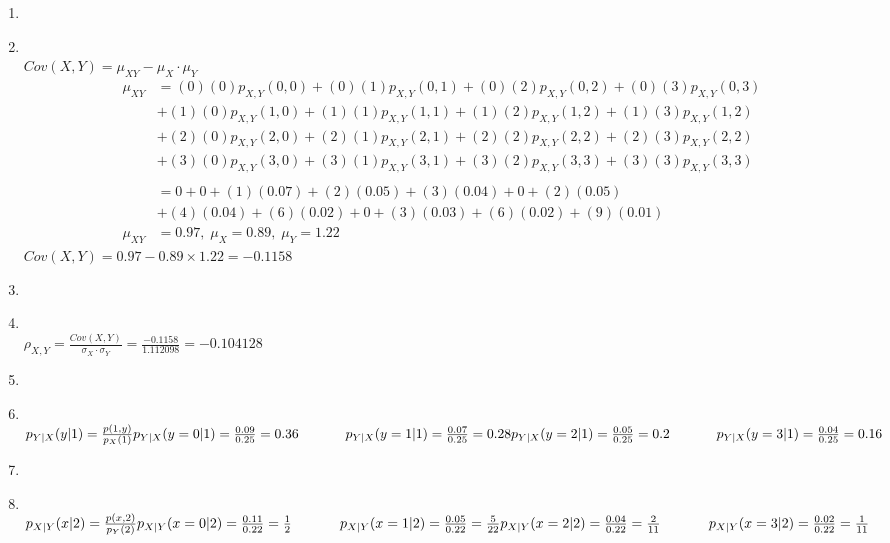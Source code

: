 \documentclass[11pt]{article}
\newcommand\Item[1][]{%
  \ifx\relax#1\relax  \item \else \item[#1] \fi
  \abovedisplayskip=0pt\abovedisplayshortskip=0pt~\vspace*{-\baselineskip}}
\begin{document}
\begin{enumerate}
\begin{enumerate}
                \Item \\
                $Cov(X,Y)=\mu_{XY} - \mu_{X}{\cdot}\mu_{Y}$ \\
                \begin{align*}
                        \mu_{XY}&=(0)(0)p_{X,Y}(0,0)+(0)(1)p_{X,Y}(0,1)+(0)(2)p_{X,Y}(0,2)+(0)(3)p_{X,Y}(0,3)\\
                        &+(1)(0)p_{X,Y}(1,0)+(1)(1)p_{X,Y}(1,1)+(1)(2)p_{X,Y}(1,2)+(1)(3)p_{X,Y}(1,2)\\
                        &+(2)(0)p_{X,Y}(2,0)+(2)(1)p_{X,Y}(2,1)+(2)(2)p_{X,Y}(2,2)+(2)(3)p_{X,Y}(2,2)\\
                        &+(3)(0)p_{X,Y} (3,0)+(3)(1)p_{X,Y}(3,1)+(3)(2)p_{X,Y}(3,3)+(3)(3)p_{X,Y}(3,3)\\\\
                        &=0+0+(1)(0.07)+(2)(0.05)+(3)(0.04)+0+(2)(0.05)\\
                        &+(4)(0.04)+(6)(0.02)+0+(3)(0.03)+(6)(0.02)+(9)(0.01)\\
                        \mu_{XY}&=0.97,\;\mu_{X}=0.89,\;\mu_{Y}=1.22
                \end{align*}
                $Cov(X,Y)=0.97-0.89{\times}1.22=-0.1158$

                \Item \\
                $\rho_{X,Y} = \frac{Cov(X,Y)}{\sigma_{X}{\cdot}\sigma_{Y}} = \frac{-0.1158}{1.112098}=-0.104128$\\

                \Item \\
                $p_{Y|X}(y|1)=\frac{p(1,y)}{p_{X}(1)}\\\\
                p_{Y|X}(y=0|1)=\frac{0.09}{0.25}=0.36  \hspace{0.1\linewidth}
                p_{Y|X}(y=1|1)=\frac{0.07}{0.25}=0.28  \\\\
                p_{Y|X}(y=2|1)=\frac{0.05}{0.25}=0.2   \hspace{0.1\linewidth}
                p_{Y|X}(y=3|1)=\frac{0.04}{0.25}=0.16$ \\

                \Item \\
                $p_{X|Y}(x|2)=\frac{p(x,2)}{p_{Y}(2)}\\\\
                p_{X|Y}(x=0|2)=\frac{0.11}{0.22}=\frac{1}{2}   \hspace{0.1\linewidth}
                p_{X|Y}(x=1|2)=\frac{0.05}{0.22}=\frac{5}{22}  \\\\
                p_{X|Y}(x=2|2)=\frac{0.04}{0.22}=\frac{2}{11}  \hspace{0.1\linewidth}
                p_{X|Y}(x=3|2)=\frac{0.02}{0.22}=\frac{1}{11}  $\\


\end{enumerate}
\end{enumerate}
\end{document}

